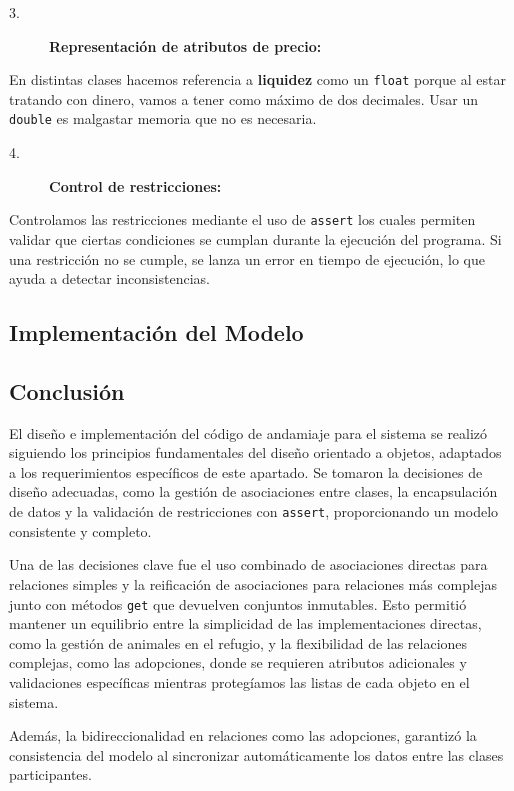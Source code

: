 \begin{description}
    \item[3.] \textbf{Representación de atributos de precio:}
\end{description}
En distintas clases hacemos referencia a \textbf{liquidez} como un \texttt{float} porque al estar tratando con dinero, vamos a tener como máximo de dos decimales. Usar un \texttt{double} es malgastar  memoria que no es necesaria.
\vspace{0.20cm}

\begin{description}
    \item[4.] \textbf{Control de restricciones:}
\end{description}
Controlamos las restricciones mediante el uso de \texttt{assert} los cuales permiten validar que ciertas condiciones se cumplan durante la ejecución del programa. Si una restricción no se cumple, se lanza un error en tiempo de ejecución, lo que ayuda a detectar inconsistencias.


\newpage



\subsection{Implementación del Modelo}


\subsection{Conclusión}

El diseño e implementación del código de andamiaje para el sistema se realizó siguiendo 
los principios fundamentales del diseño orientado a objetos, adaptados a los requerimientos 
específicos de este apartado. Se tomaron la decisiones de diseño adecuadas, como la gestión 
de asociaciones entre clases, la encapsulación de datos y la validación de restricciones con \texttt{assert}, 
proporcionando un modelo consistente y completo.\par
\vspace{0.15cm}
Una de las decisiones clave fue el uso combinado de asociaciones directas para relaciones 
simples y la reificación de asociaciones para relaciones más complejas junto con métodos \texttt{get}
que devuelven conjuntos inmutables. Esto permitió mantener un equilibrio entre la simplicidad de las 
implementaciones directas, como la gestión de animales en el refugio, y la flexibilidad 
de las relaciones complejas, como las adopciones, donde se requieren atributos adicionales 
y validaciones específicas mientras protegíamos las listas de cada objeto en el sistema.\par
\vspace{0.15cm}
Además, la bidireccionalidad en relaciones como las adopciones, garantizó la 
consistencia del modelo al sincronizar automáticamente los datos entre las
clases participantes.\par

\newpage
